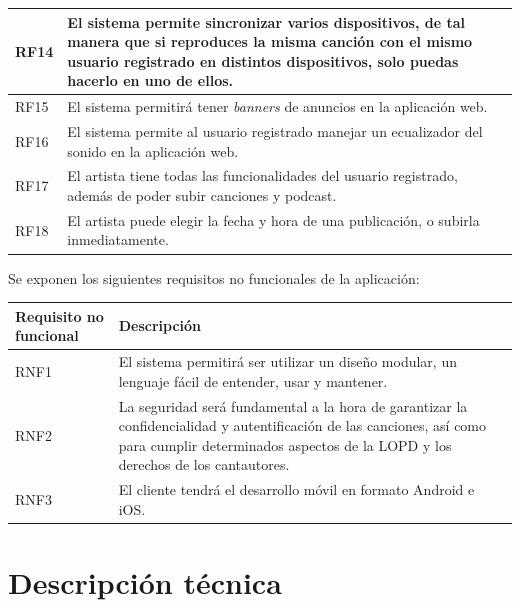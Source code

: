 \documentclass{article}
\begin{document}
\begin{table}[H]
\begin{tabular}{p{4cm} p{10cm}}
		\hline
		RF14
		&  El sistema permite sincronizar varios dispositivos, de tal manera que si reproduces la misma canción con el mismo usuario registrado en distintos dispositivos, solo puedas hacerlo en uno de ellos.\\
		\hline
		RF15
		&  El sistema permitirá tener \textit{banners} de anuncios en la aplicación web.\\
		\hline
		RF16
		& El sistema permite al usuario registrado manejar un ecualizador del sonido en la aplicación web. \\ 
		\hline
		RF17
		& El artista tiene todas las funcionalidades del usuario registrado, además de poder subir canciones y podcast. \\ 
		\hline
		RF18
		& El artista puede elegir la fecha y hora de una publicación, o subirla inmediatamente. \\ 
		\hline
	\end{tabular}
\end{table}
\break
Se exponen los siguientes requisitos no funcionales de la aplicación:

\begin{table}[H]
	\begin{tabular}{p{4cm} p{10cm}}
		\hline
		\hline 
		\textbf{Requisito no funcional} & \textbf{Descripción} \\ 
		\hline
		\hline
		RNF1 
		&  El sistema permitirá ser utilizar un diseño modular, un lenguaje fácil de entender, usar y mantener.\\ 
		\hline
		RNF2
		&  La seguridad será fundamental a la hora de garantizar la confidencialidad y autentificación de las canciones, así como para cumplir determinados aspectos de la LOPD y los derechos de los cantautores.\\ 
		\hline
		RNF3
		&  El cliente tendrá el desarrollo móvil en formato Android e iOS.\\ 
		\hline
	\end{tabular}
\end{table}
\newpage

\section{Descripción técnica}
\end{document}
